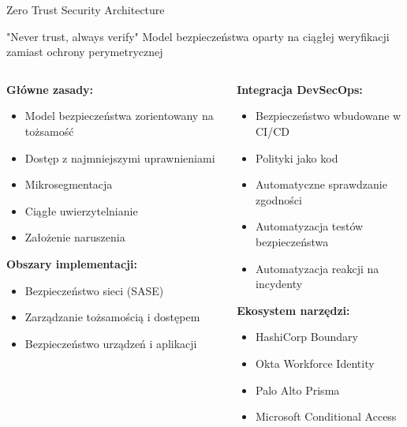 \documentclass[10pt, aspectratio=169]{beamer}
\begin{document}
\begin{frame}{Zero Trust Security Architecture}
\begin{alertblock}{"Never trust, always verify"}
Model bezpieczeństwa oparty na ciągłej weryfikacji zamiast ochrony perymetrycznej
\end{alertblock}

\begin{columns}[T]
\begin{column}{0.5\textwidth}
\textbf{Główne zasady:}
\begin{itemize}
\item Model bezpieczeństwa zorientowany na tożsamość
\item Dostęp z najmniejszymi uprawnieniami
\item Mikrosegmentacja
\item Ciągłe uwierzytelnianie
\item Założenie naruszenia
\end{itemize}

\textbf{Obszary implementacji:}
\begin{itemize}
\item Bezpieczeństwo sieci (SASE)
\item Zarządzanie tożsamością i dostępem
\item Bezpieczeństwo urządzeń i aplikacji
\end{itemize}
\end{column}
\begin{column}{0.5\textwidth}
\textbf{Integracja DevSecOps:}
\begin{itemize}
\item Bezpieczeństwo wbudowane w CI/CD
\item Polityki jako kod
\item Automatyczne sprawdzanie zgodności
\item Automatyzacja testów bezpieczeństwa
\item Automatyzacja reakcji na incydenty
\end{itemize}

\textbf{Ekosystem narzędzi:}
\begin{itemize}
\item HashiCorp Boundary
\item Okta Workforce Identity
\item Palo Alto Prisma
\item Microsoft Conditional Access
\end{itemize}
\end{column}
\end{columns}
\end{frame}
\end{document}
